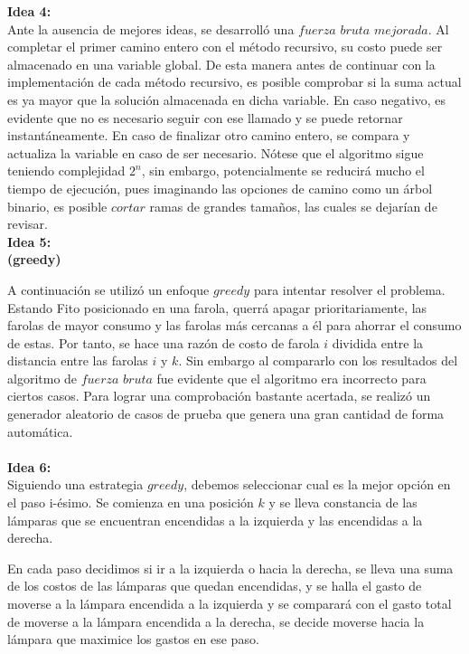 \documentclass[10pt,letterpaper]{article}
\begin{document}
{ 	{\Large \bf Idea 4:}\\
 		
 	Ante la ausencia de mejores ideas, se desarroll\'o una $fuerza$ $bruta$ $mejorada$. Al completar el primer camino entero con el m\'etodo recursivo, su costo puede ser almacenado en una variable global. De esta manera antes de continuar con la implementaci\'on de cada m\'etodo recursivo, es posible comprobar si la suma actual es ya mayor que la soluci\'on almacenada en dicha variable. En caso negativo, es evidente que no es necesario seguir con ese llamado y se puede retornar instant\'aneamente. En caso de finalizar otro camino entero, se compara y actualiza la variable en caso de ser necesario. N\'otese que el algoritmo sigue teniendo complejidad $2^{n}$, sin embargo, potencialmente se reducir\'a mucho el tiempo de ejecuci\'on, pues imaginando las opciones de camino como un \'arbol binario, es posible $cortar$ ramas de grandes tama\~nos, las cuales se dejar\'ian de revisar.\\ 
 	
 	
 	{\Large \bf Idea 5:}\\
 	
 	{\small \bf (greedy)}
 	
 	A continuaci\'on se utiliz\'o un enfoque $greedy$ para intentar resolver el problema. Estando Fito posicionado en una farola, querr\'a apagar prioritariamente, las farolas de mayor consumo y las farolas m\'as cercanas a \'el para ahorrar el consumo de estas. Por tanto, se hace una raz\'on de costo de farola $i$ dividida entre la distancia entre las farolas $i$ y $k$. Sin embargo al compararlo con los resultados del algoritmo de $fuerza$ $bruta$ fue evidente que el algoritmo era incorrecto para ciertos casos. Para lograr una comprobaci\'on bastante acertada, se realiz\'o un generador aleatorio de casos de prueba que genera una gran cantidad de forma autom\'atica.\\ \\
 	
 	
 	{\Large \bf Idea 6:}\\
 	
 	Siguiendo una estrategia $greedy$, debemos seleccionar cual es la mejor opci\'on en el paso i-\'esimo. Se comienza en una posici\'on $k$ y se lleva constancia de las l\'amparas que se encuentran encendidas a la izquierda y las encendidas a la derecha. 
 	
 	En cada paso decidimos si ir a la izquierda o hacia la derecha, se lleva una suma de los costos de las l\'amparas que quedan encendidas, y se halla el gasto de moverse a la l\'ampara encendida a la izquierda y se comparar\'a con el gasto total de moverse a la l\'ampara encendida a la derecha, se decide moverse hacia la l\'ampara que maximice los gastos en ese paso. 
 	
}
\end{document}
